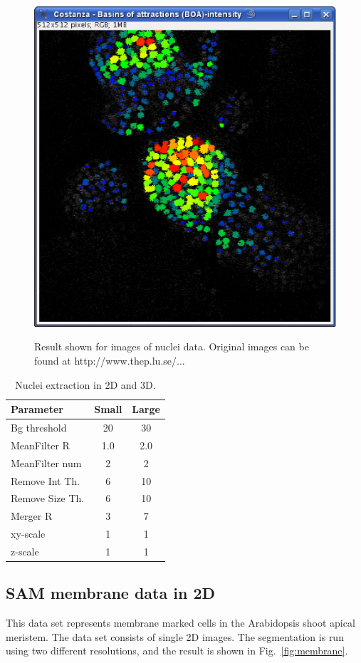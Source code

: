 \documentclass[a4paper,12pt]{article}
\begin{document}
\begin{figure}[h!]
\begin{center}
{\label{fig:43boas}\includegraphics[width=0.4\columnwidth]{figures1/boas.eps}
}
\caption{Result shown for images of nuclei data. Original images can be found at http://www.thep.lu.se/...}
\label{fig:43zoom}
\end{center}
\end{figure}


\begin{table}
	\begin{center}
		\begin{tabular}{|l|cc|}
			\hline
			Parameter & Small & Large\\
			\hline
			Bg threshold & 20 & 30\\
			MeanFilter R & 1.0 & 2.0\\
			MeanFilter num & 2 & 2\\
			Remove Int Th. & 6 & 10\\
			Remove Size Th. & 6 & 10\\
			Merger R & 3 & 7\\
			xy-scale & 1 & 1\\
			z-scale & 1 & 1\\
			\hline
		\end{tabular}
		\caption{Nuclei extraction in 2D and 3D.}
		\label{tab:43zoom}
	\end{center}
\end{table}

\subsection{SAM membrane data in 2D}


This data set represents membrane marked cells in the Arabidopsis shoot apical
meristem. The data set consists of single 2D images. The segmentation is run
using two different resolutions, and the result is shown in
Fig.~\ref{fig:membrane}.
\end{document}
